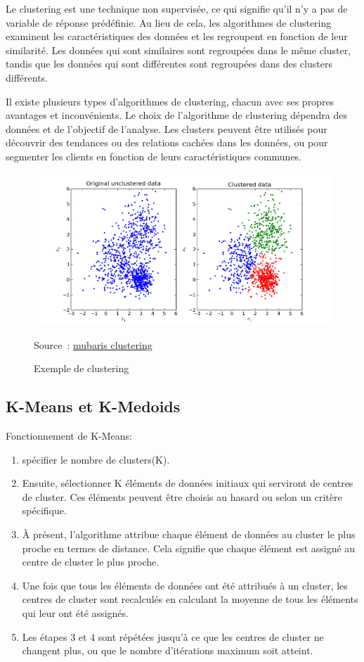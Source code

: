 Le clustering est une technique non supervisée, ce qui signifie qu'il n'y a pas de variable de réponse prédéfinie. Au lieu de cela, les algorithmes de clustering examinent les caractéristiques des données et les regroupent en fonction de leur similarité. Les données qui sont similaires sont regroupées dans le même cluster, tandis que les données qui sont différentes sont regroupées dans des clusters différents.

Il existe plusieurs types d'algorithmes de clustering, chacun avec ses propres avantages et inconvénients.
Le choix de l'algorithme de clustering dépendra des données et de l'objectif de l'analyse. Les clusters peuvent être utilisés pour découvrir des tendances ou des relations cachées dans les données, ou pour segmenter les clients en fonction de leurs caractéristiques communes.

\begin{figure}[!ht]
    \centering
    \includegraphics[width=1\textwidth]{Images/clustering.png}
    \caption{Exemple de clustering}
    \label{fig_clustering}
    Source : \href{https://mubaris.com/posts/kmeans-clustering/}{mubaris clustering}
\end{figure}

\newpage

\subsection{K-Means et K-Medoids}
\label{algo_k}
Fonctionnement de K-Means:

\begin{enumerate}
    \item spécifier le nombre de clusters(K).
    \item Ensuite, sélectionner K éléments de données initiaux qui serviront de centres de cluster. Ces éléments peuvent être choisis au hasard ou selon un critère spécifique.
    \item À présent, l'algorithme attribue chaque élément de données au cluster le plus proche en termes de distance. Cela signifie que chaque élément est assigné au centre de cluster le plus proche.
    \item Une fois que tous les éléments de données ont été attribués à un cluster, les centres de cluster sont recalculés en calculant la moyenne de tous les éléments qui leur ont été assignés.
    \item Les étapes 3 et 4 sont répétées jusqu'à ce que les centres de cluster ne changent plus, ou que le nombre d'itérations maximum soit atteint.
\end{enumerate}

